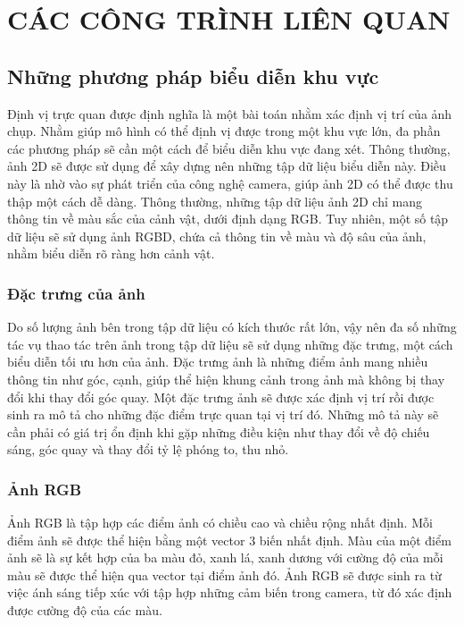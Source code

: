 \chapter{CÁC CÔNG TRÌNH LIÊN QUAN}

\section{Những phương pháp biểu diễn khu vực}

Định vị trực quan được định nghĩa là một bài toán nhằm xác định vị trí của ảnh chụp. Nhằm giúp mô hình có thể định vị được trong một khu vực lớn, đa phần các phương pháp sẽ cần một cách để biểu diễn khu vực đang xét. Thông thường, ảnh 2D sẽ được sử dụng để xây dựng nên những tập dữ liệu biểu diễn này. Điều này là nhờ vào sự phát triển của công nghệ camera, giúp ảnh 2D có thể được thu thập một cách dễ dàng. Thông thường, những tập dữ liệu ảnh 2D chỉ mang thông tin về màu sắc của cảnh vật, dưới định dạng RGB. Tuy nhiên, một số tập dữ liệu sẽ sử dụng ảnh RGBD, chứa cả thông tin về màu và độ sâu của ảnh, nhằm biểu diễn rõ ràng hơn cảnh vật.

\subsection{Đặc trưng của ảnh}

Do số lượng ảnh bên trong tập dữ liệu có kích thước rất lớn, vậy nên đa số những tác vụ thao tác trên ảnh trong tập dữ liệu sẽ sử dụng những đặc trưng, một cách biểu diễn tối ưu hơn của ảnh. Đặc trưng ảnh là những điểm ảnh mang nhiều thông tin như góc, cạnh, giúp thể hiện khung cảnh trong ảnh mà không bị thay đổi khi thay đổi góc quay. Một đặc trưng ảnh sẽ được xác định vị trí rồi được sinh ra mô tả cho những đặc điểm trực quan tại vị trí đó. Những mô tả này sẽ cần phải có giá trị ổn định khi gặp những điều kiện như thay đổi về độ chiếu sáng, góc quay và thay đổi tỷ lệ phóng to, thu nhỏ.

\subsection{Ảnh RGB}

Ảnh RGB là tập hợp các điểm ảnh có chiều cao và chiều rộng nhất định. Mỗi điểm ảnh sẽ được thể hiện bằng một vector 3 biến nhất định. Màu của một điểm ảnh sẽ là sự kết hợp của ba màu đỏ, xanh lá, xanh dương với cường độ của mỗi màu sẽ được thể hiện qua vector tại điểm ảnh đó. Ảnh RGB sẽ được sinh ra từ việc ánh sáng tiếp xúc với tập hợp những cảm biến trong camera, từ đó xác định được cường độ của các màu.


